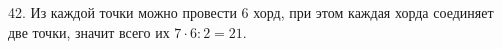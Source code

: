 42. Из каждой точки можно провести 6 хорд, при этом каждая хорда соединяет две точки, значит всего их $7\cdot6:2=21.$\\
